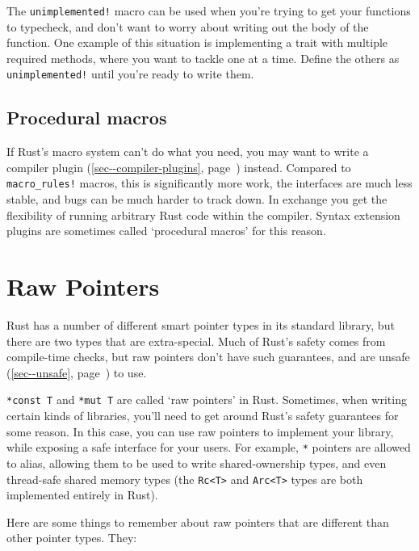 \documentclass[a4paper,]{book}
\renewcommand*{\hypertarget}[3][\ar]{%
  \def\ar{#2}%
  \label{#1}%
  #3}
\renewcommand*{\hyperlink}[2]{%
 #2 (\autoref{#1}, page~\pageref{#1})}
\begin{document}
The \texttt{unimplemented!} macro can be used when you're trying to get
your functions to typecheck, and don't want to worry about writing out
the body of the function. One example of this situation is implementing
a trait with multiple required methods, where you want to tackle one at
a time. Define the others as \texttt{unimplemented!} until you're ready
to write them.

\subsection{Procedural macros}\label{procedural-macros}

If Rust's macro system can't do what you need, you may want to write a
\protect\hyperlink{sec--compiler-plugins}{compiler plugin} instead.
Compared to \texttt{macro\_rules!} macros, this is significantly more
work, the interfaces are much less stable, and bugs can be much harder
to track down. In exchange you get the flexibility of running arbitrary
Rust code within the compiler. Syntax extension plugins are sometimes
called `procedural macros' for this reason.

\hypertarget{sec--raw-pointers}{\section{Raw
Pointers}\label{sec--raw-pointers}}

Rust has a number of different smart pointer types in its standard
library, but there are two types that are extra-special. Much of Rust's
safety comes from compile-time checks, but raw pointers don't have such
guarantees, and are \protect\hyperlink{sec--unsafe}{unsafe} to use.

\texttt{*const\ T} and \texttt{*mut\ T} are called `raw pointers' in
Rust. Sometimes, when writing certain kinds of libraries, you'll need to
get around Rust's safety guarantees for some reason. In this case, you
can use raw pointers to implement your library, while exposing a safe
interface for your users. For example, \texttt{*} pointers are allowed
to alias, allowing them to be used to write shared-ownership types, and
even thread-safe shared memory types (the
\texttt{Rc\textless{}T\textgreater{}} and
\texttt{Arc\textless{}T\textgreater{}} types are both implemented
entirely in Rust).

Here are some things to remember about raw pointers that are different
than other pointer types. They:
\end{document}
